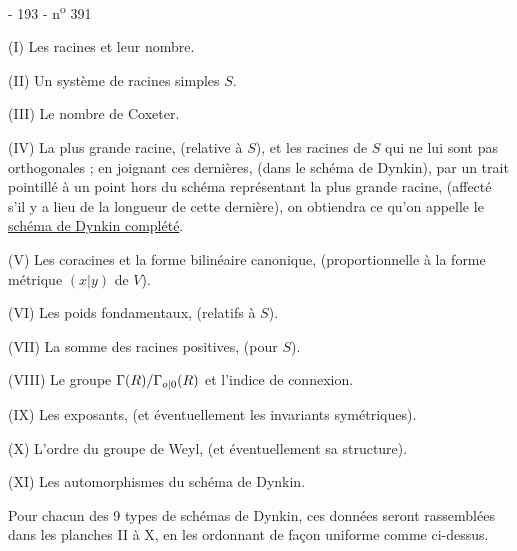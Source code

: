 - 193 - \hfill n\textsuperscript{o} 391

(I) Les racines et leur nombre.

(II) Un système de racines simples $S$.

(III) Le nombre de Coxeter.

(IV) La plus grande racine, (relative à $S$), et les racines de $S$ qui ne lui sont pas orthogonales ; en joignant ces dernières, (dans le schéma de Dynkin), par un trait pointillé à un point hors du schéma représentant la plus grande racine, (affecté s'il y a lieu de la longueur de cette dernière), on obtiendra ce qu'on appelle le \uline{schéma de Dynkin complété}.

(V) Les coracines et la forme bilinéaire canonique, (proportionnelle à la forme métrique $(x|y)$ de $V$).

(VI) Les poids fondamentaux, (relatifs à $S$).

(VII) La somme des racines positives, (pour $S$).

(VIII) Le groupe $\Gamma(R)/\Gamma_{\relax{o|0}}(R)$ et l'indice de connexion.

(IX) Les exposants, (et éventuellement les invariants symétriques).

(X) L'ordre du groupe de Weyl, (et éventuellement sa structure).

(XI) Les automorphismes du schéma de Dynkin.

Pour chacun des 9 types de schémas de Dynkin, ces données seront rassemblées dans les planches II à X, en les ordonnant de façon uniforme comme ci-dessus.
